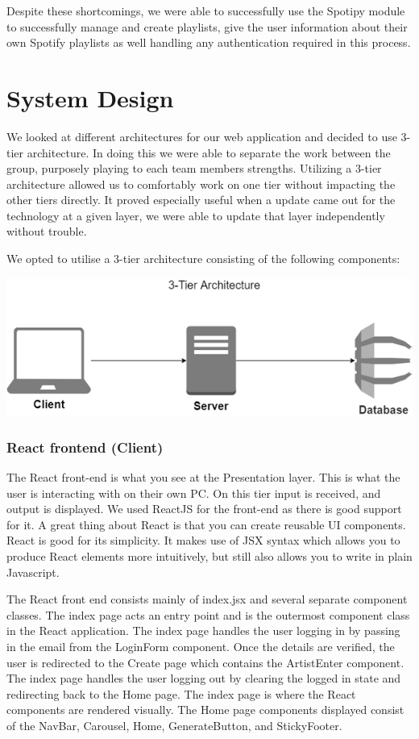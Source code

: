 Despite these shortcomings, we were able to successfully use the Spotipy module to successfully manage and create playlists, give the user information about their own Spotify playlists as well handling any authentication required in this process.


\chapter{System Design}
We looked at different architectures for our web application and decided to use 3-tier architecture. In doing this we were able to separate the work between the group, purposely playing to each team members strengths. Utilizing a 3-tier architecture allowed us to comfortably work on one tier without impacting the other tiers directly. It proved especially useful when a update came out for the technology at a given layer, we were able to update that layer independently without trouble.


We opted to utilise a 3-tier architecture consisting of the following components:

\begin{center}    
	\includegraphics{img/3tier.png}
\end{center}

\subsection{React frontend (Client)}
The React front-end is what you see at the Presentation layer. This is what the user is interacting with on their own PC. On this tier input is received, and output is displayed.
We used ReactJS for the front-end as there is good support for it. A great thing about React is that you can create reusable UI components. React is good for its simplicity. It makes use of JSX syntax which allows you to produce React elements more intuitively, but still also allows you to write in plain Javascript.


The React front end consists mainly of index.jsx and several separate component classes. The index page acts an entry point and is the outermost component class in the React application. The index page handles the user logging in by passing in the email from the LoginForm component. Once the details are verified, the user is redirected to the Create page which contains the ArtistEnter component. The index page handles the user logging out by clearing the logged in state and redirecting back to the Home page. 
The index page is where the React components are rendered visually. The Home page components displayed consist of the NavBar, Carousel, Home, GenerateButton, and StickyFooter. 

